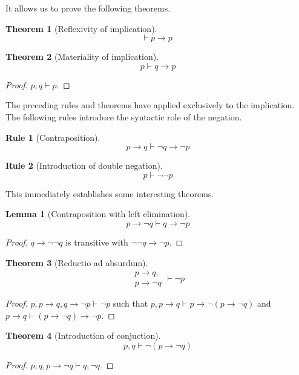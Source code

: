 \documentclass{amsbook}
\newcommand{\infers}{\mathrel\vdash}
\newcommand{\theorem}{\mathord\vdash\medspace}
\newcommand{\then}{\mathrel\rightarrow}
\theoremstyle{definition}
\newtheorem{frule}{Rule}[section]
\newtheorem{thm}{Theorem}[section]
\newtheorem{lmm}{Lemma}[section]
\begin{document}
It allows us to prove the following theorems.

\begin{thm}[Reflexivity of implication]
    $$\theorem p \then p$$
\end{thm}

\begin{thm}[Materiality of implication]
    $$p \infers q \then p$$
    \begin{proof}
        $p, q \infers p$.
    \end{proof}
\end{thm}

The preceding rules and theorems have applied exclusively to the implication. The following rules introduce the syntactic role of the negation.

\begin{frule}[Contraposition]
    $$p \then q \infers \neg q \then \neg p$$
\end{frule}

\begin{frule}[Introduction of double negation]
    $$p \infers \neg\neg p$$
\end{frule}

This immediately establishes some interesting theorems.

\begin{lmm}[Contraposition with left elimination]
    $$p \then \neg q \infers q \then \neg p$$
    \begin{proof}
        $q \then \neg\neg q$ is transitive with $\neg\neg q \then \neg p$.
    \end{proof}
\end{lmm}

\begin{thm}[Reductio ad absurdum]
    $$\begin{aligned}
            p \then q, \\ p \then \neg q
        \end{aligned} \infers \neg p$$
    \begin{proof}
        $p, p \then q, q \then \neg p \infers \neg p$ such that $p, p \then q \infers p \then \neg(p \then \neg q)$ and $p \then q \infers (p \then \neg q) \then \neg p$.
    \end{proof}
\end{thm}

\begin{thm}[Introduction of conjuction]
    $$p, q \infers \neg(p \then \neg q)$$
    \begin{proof}
        $p, q, p \then \neg q \infers q, \neg q$.
    \end{proof}
\end{thm}
\end{document}
